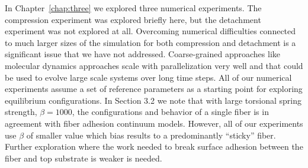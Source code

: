 In Chapter~\ref{chap:three} we explored three numerical experiments.
The compression experiment was explored briefly here, but the detachment experiment was not explored at all.
Overcoming numerical difficulties connected to much larger sizes of the simulation for both compression and detachment is a significant issue that we have not addressed.
Coarse-grained approaches like molecular dynamics approaches scale with parallelization very well and that could be used to evolve large scale systems over long time steps.
All of our numerical experiments assume a set of reference parameters as a starting point for exploring equilibrium configurations.
In Section 3.2 we note that with large torsional spring strength, $\beta = 1000$, the configurations and behavior of a single fiber is in agreement with fiber adhesion continuum models.
However, all of our experiments use $\beta$ of smaller value which bias results to a predominantly ``sticky'' fiber.
Further exploration where the work needed to break surface adhesion between the fiber and top substrate is weaker is needed.
